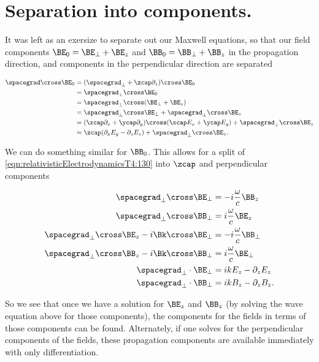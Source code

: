 \section{Separation into components.}

It was left as an exersize to separate out our Maxwell equations, so that our field components $\BE_0 = \BE_\perp + \BE_z$ and $\BB_0 = \BB_\perp + \BB_z$ in the propagation direction, and components in the perpendicular direction are separated

\begin{align*}
\spacegrad \cross \BE_0 
&=
(\spacegrad_\perp + \zcap\partial_z) \cross \BE_0 \\
&=
\spacegrad_\perp \cross \BE_0 \\
&=
\spacegrad_\perp \cross (\BE_\perp + \BE_z) \\
&=
\spacegrad_\perp \cross \BE_\perp 
+\spacegrad_\perp \cross \BE_z \\
&=
( \xcap \partial_x +\ycap \partial_y ) \cross ( \xcap E_x +\ycap E_y ) 
+\spacegrad_\perp \cross \BE_z \\
&=
\zcap (\partial_x E_y - \partial_z E_z) 
+\spacegrad_\perp \cross \BE_z.
\end{align*}

We can do something similar for $\BB_0$.  This allows for a split of \ref{eqn:relativisticElectrodynamicsT4:130} into $\zcap$ and perpendicular components

\begin{align}\label{eqn:relativisticElectrodynamicsT4:130}
\spacegrad_\perp \cross \BE_\perp &= -i \frac{\omega}{c} \BB_z \\
\spacegrad_\perp \cross \BB_\perp &= i \frac{\omega}{c} \BE_z \\
\spacegrad_\perp \cross \BE_z - i \Bk \cross \BE_\perp &= -i \frac{\omega}{c} \BB_\perp \\
\spacegrad_\perp \cross \BB_z - i \Bk \cross \BB_\perp &= i \frac{\omega}{c} \BE_\perp \\
\spacegrad_\perp \cdot \BE_\perp &= i k E_z - \partial_z E_z \\
\spacegrad_\perp \cdot \BB_\perp &= i k B_z - \partial_z B_z.
\end{align}

So we see that once we have a solution for $\BE_z$ and $\BB_z$ (by solving the wave equation above for those components), the components for the fields in terms of those components can be found.  Alternately, if one solves for the perpendicular components of the fields, these propagation components are available immediately with only differentiation.

